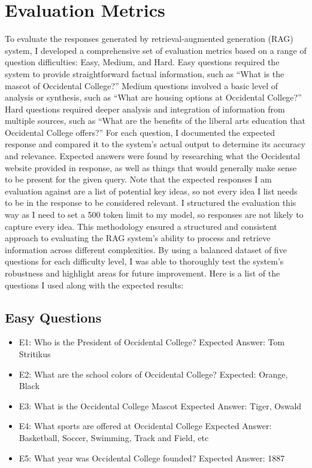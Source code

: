 \documentclass[10pt,twocolumn]{article}
\begin{document}
\section{Evaluation Metrics}
To evaluate the responses generated by retrieval-augmented generation (RAG) system, I developed a comprehensive set of evaluation metrics based on a range of question difficulties: Easy, Medium, and Hard. Easy questions required the system to provide straightforward factual information, such as “What is the mascot of Occidental College?” Medium questions involved a basic level of analysis or synthesis, such as “What are housing options at Occidental College?” Hard questions required deeper analysis and integration of information from multiple sources, such as “What are the benefits of the liberal arts education that Occidental College offers?” For each question, I documented the expected response and compared it to the system’s actual output to determine its accuracy and relevance\cite{finetunedb_evaluate_llm_outputs}. Expected answers were found by researching what the Occidental website provided in response, as well as things that would generally make sense to be present for the given query. Note that the expected responses I am evaluation against are a list of potential key ideas, so not every idea I list needs to be in the response to be considered relevant. I structured the evaluation this way as I need to set a 500 token limit to my model, so responses are not likely to capture every idea. This methodology ensured a structured and consistent approach to evaluating the RAG system's ability to process and retrieve information across different complexities. By using a balanced dataset of five questions for each difficulty level, I was able to thoroughly test the system’s robustness and highlight areas for future improvement. Here is a list of the questions I used along with the expected results:

\subsection{Easy Questions}
\begin{itemize}
    \item E1: Who is the President of Occidental College?
    Expected Answer: Tom Stritikus
    \item E2: What are the school colors of Occidental College?
    Expected: Orange, Black
    \item E3: What is the Occidental College Mascot
    Expected Answer: Tiger, Oswald
    \item E4: What sports are offered at Occidental College
    Expected Answer: Basketball, Soccer, Swimming, Track and Field, etc
    \item E5: What year was Occidental College founded?
    Expected Answer: 1887
\end{itemize}
\end{document}
